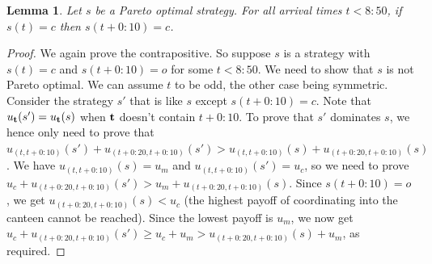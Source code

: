 \documentclass[twocolumn,a4paper,superscriptaddress,nofootinbib]{revtex4}
\newtheorem{lemma}[theorem]{Lemma}
\begin{document}
\begin{lemma}\label{lemma:canteen-propagate} 
Let $s$ be a Pareto optimal strategy. For all arrival times $t < 8{:}50$, if $s(t)= c$ then $s(t+0{:}10) = c$.
\end{lemma}
\begin{proof}
  We again prove the contrapositive. So suppose
$s$ is a strategy with $s(t) = c$ and $s(t+0{:}10) = o$ for some $t < 8{:}50$. We need to show that $s$ is not Pareto optimal. We can assume $t$ to be odd, the other case being symmetric. Consider the strategy $s'$ that is like $s$ except $s(t+0{:}10) = c$. Note that $u_{\bf t}(s') = u_{\bf t}(s)$ when $\bf t$ doesn't contain $t+0{:}10$. To prove that $s'$ dominates $s$, we hence only need to prove that $u_{(t,t+0{:}10)}(s') + u_{(t+0{:}20,t+0{:}10)}(s') > u_{(t,t+0{:}10)}(s) + u_{(t+0{:}20,t+0{:}10)}(s)$.
We have $u_{(t,t+0{:}10)}(s) = u_m$ and $u_{(t,t+0{:}10)}(s') = u_c$, so we need to prove $u_c + u_{(t+0{:}20,t+0{:}10)}(s') > u_m + u_{(t+0{:}20,t+0{:}10)}(s)$. Since $s(t+0{:}10) = o$, we get $u_{(t+0{:}20,t+0{:}10)}(s) < u_c$ (the highest payoff of coordinating into the canteen cannot be reached). Since the lowest payoff is $u_m$, we now get $u_c + u_{(t+0{:}20,t+0{:}10)}(s') \geq u_c + u_m > u_{(t+0{:}20,t+0{:}10)}(s) + u_m$, as required.
%
\end{proof}
\end{document}
